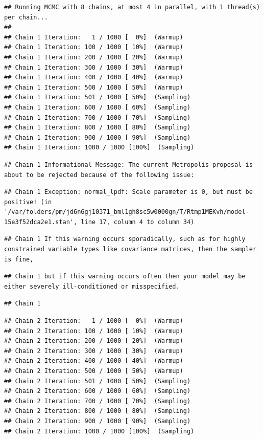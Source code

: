 \documentclass[
]{book}
\begin{document}
\begin{verbatim}
## Running MCMC with 8 chains, at most 4 in parallel, with 1 thread(s) per chain...
## 
## Chain 1 Iteration:   1 / 1000 [  0%]  (Warmup) 
## Chain 1 Iteration: 100 / 1000 [ 10%]  (Warmup) 
## Chain 1 Iteration: 200 / 1000 [ 20%]  (Warmup) 
## Chain 1 Iteration: 300 / 1000 [ 30%]  (Warmup) 
## Chain 1 Iteration: 400 / 1000 [ 40%]  (Warmup) 
## Chain 1 Iteration: 500 / 1000 [ 50%]  (Warmup) 
## Chain 1 Iteration: 501 / 1000 [ 50%]  (Sampling) 
## Chain 1 Iteration: 600 / 1000 [ 60%]  (Sampling) 
## Chain 1 Iteration: 700 / 1000 [ 70%]  (Sampling) 
## Chain 1 Iteration: 800 / 1000 [ 80%]  (Sampling) 
## Chain 1 Iteration: 900 / 1000 [ 90%]  (Sampling) 
## Chain 1 Iteration: 1000 / 1000 [100%]  (Sampling)
\end{verbatim}

\begin{verbatim}
## Chain 1 Informational Message: The current Metropolis proposal is about to be rejected because of the following issue:
\end{verbatim}

\begin{verbatim}
## Chain 1 Exception: normal_lpdf: Scale parameter is 0, but must be positive! (in '/var/folders/pm/jd6n6gj10371_bml1gh8sc5w0000gn/T/Rtmp1MEKvh/model-15e3f52dca2e1.stan', line 17, column 4 to column 34)
\end{verbatim}

\begin{verbatim}
## Chain 1 If this warning occurs sporadically, such as for highly constrained variable types like covariance matrices, then the sampler is fine,
\end{verbatim}

\begin{verbatim}
## Chain 1 but if this warning occurs often then your model may be either severely ill-conditioned or misspecified.
\end{verbatim}

\begin{verbatim}
## Chain 1
\end{verbatim}

\begin{verbatim}
## Chain 2 Iteration:   1 / 1000 [  0%]  (Warmup) 
## Chain 2 Iteration: 100 / 1000 [ 10%]  (Warmup) 
## Chain 2 Iteration: 200 / 1000 [ 20%]  (Warmup) 
## Chain 2 Iteration: 300 / 1000 [ 30%]  (Warmup) 
## Chain 2 Iteration: 400 / 1000 [ 40%]  (Warmup) 
## Chain 2 Iteration: 500 / 1000 [ 50%]  (Warmup) 
## Chain 2 Iteration: 501 / 1000 [ 50%]  (Sampling) 
## Chain 2 Iteration: 600 / 1000 [ 60%]  (Sampling) 
## Chain 2 Iteration: 700 / 1000 [ 70%]  (Sampling) 
## Chain 2 Iteration: 800 / 1000 [ 80%]  (Sampling) 
## Chain 2 Iteration: 900 / 1000 [ 90%]  (Sampling) 
## Chain 2 Iteration: 1000 / 1000 [100%]  (Sampling)
\end{verbatim}
\end{document}
